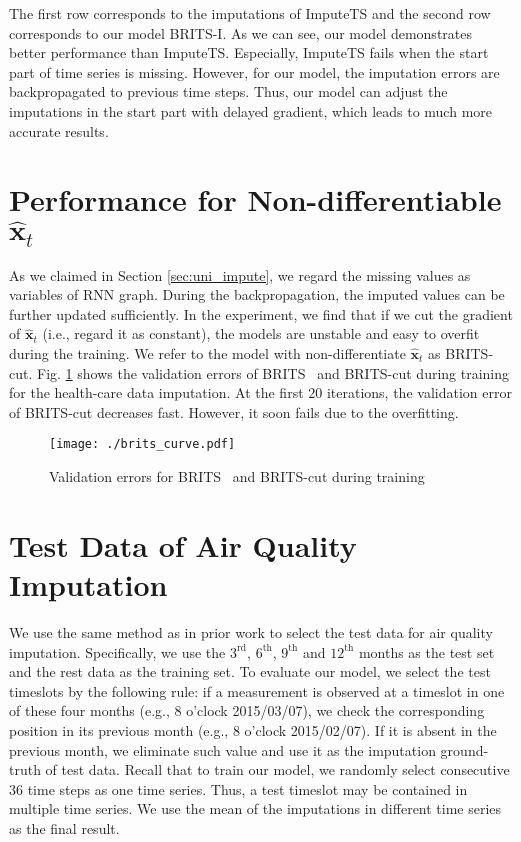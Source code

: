 \documentclass{article}
\newcommand{\britsi}{\xspace{BRITS-I}}
\newcommand{\brits}{\xspace{BRITS}}
\newcommand{\x}{{\mathbf x}}
\begin{document}
The first row corresponds to the imputations of ImputeTS and the second row corresponds to our model \britsi. As we can see, our model demonstrates better performance than ImputeTS. Especially, ImputeTS fails when the start part of time series is missing. However, for our model, the imputation errors are backpropagated to previous time steps. Thus, our model can adjust the imputations in the start part with delayed gradient, which leads to much more accurate results.



\section{Performance for Non-differentiable $\hat{\x}_t$}
\label{appendix:cut}
As we claimed in Section \ref{sec:uni_impute}, we regard the missing values as variables of RNN graph. During the backpropagation, the imputed values can be further updated sufficiently. In the experiment, we find that if we cut the gradient of $\hat{\x}_t$ (i.e., regard it as constant), the models are unstable and easy to overfit during the training. We refer to the model with non-differentiate $\hat{\x}_t$ as \brits-cut.
Fig. \ref{fig:brits_curve} shows the validation errors of \brits~ and \brits-cut during training for the health-care data imputation. At the first $20$ iterations,  the validation error of \brits-cut decreases fast. However, it soon fails due to the overfitting.

\begin{figure}[t] 
\centering
\texttt{[image: ./brits\_curve.pdf]} 
\caption{Validation errors for \brits~ and \brits-cut during training}
\label{fig:brits_curve} 
\end{figure} 

\section{Test Data of Air Quality Imputation}
\label{appendix:air}
We use the same method as in prior work \cite{yi2016st} to select the test data for air quality imputation. Specifically, we use the $3^{\mathrm{rd}}$, $6^{\mathrm{th}}$, $9^{\mathrm{th}}$ and $12^{\mathrm{th}}$ months as the test set and the rest data as the training set. To evaluate our model, we select the test timeslots by the following rule: if a measurement is observed at a timeslot in one of these four months (e.g., 8 o'clock 2015/03/07), we check the corresponding position in its previous month (e.g., 8 o'clock 2015/02/07). If it is absent in the previous month, we eliminate such value  and use it as the imputation ground-truth of test data.  Recall that to train our model, we randomly select consecutive $36$ time steps as one time series. Thus, 
 a test timeslot may be contained in multiple time series. We use the mean of the imputations in different time series as the final result.
  
\end{document}
